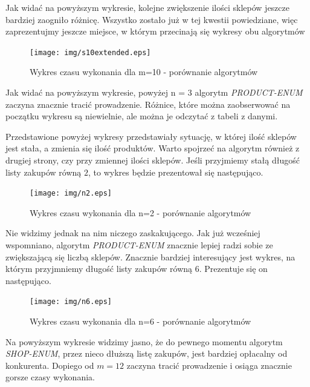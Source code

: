\documentclass[a4paper]{article}
\begin{document}
Jak widać na powyższym wykresie, kolejne zwiększenie ilości sklepów jeszcze bardziej zaogniło różnicę. Wszystko zostało już w tej kwestii powiedziane, więc zaprezentujmy jeszcze miejsce, w którym przecinają się wykresy obu algorytmów

\begin{figure}[H]
\centering
\texttt{[image: img/s10extended.eps]}
\caption{Wykres czasu wykonania dla m=10 - porównanie algorytmów}
\end{figure}

Jak widać na powyższym wykresie, powyżej n = 3 algorytm \textit{PRODUCT-ENUM} zaczyna znacznie tracić prowadzenie. Różnice, które można zaobserwować na początku wykresu są niewielnie, ale można je odczytać z tabeli z danymi. 

Przedstawione powyżej wykresy przedstawiały sytuację, w której ilość sklepów jest stała, a zmienia się ilość produktów. Warto spojrzeć na algorytm również z drugiej strony, czy przy zmiennej ilości sklepów. Jeśli przyjmiemy stałą długość listy zakupów równą $2$, to wykres będzie prezentował się następująco.

\begin{figure}[H]
\centering
\texttt{[image: img/n2.eps]}
\caption{Wykres czasu wykonania dla n=2 - porównanie algorytmów}
\end{figure}

Nie widzimy jednak na nim niczego zaskakującego. Jak już wcześniej wspomniano, algorytm \textit{PRODUCT-ENUM} znacznie lepiej radzi sobie ze zwiększającą się liczbą sklepów. Znacznie bardziej interesujący jest wykres, na którym przyjmniemy długość listy zakupów równą $6$. Prezentuje się on następująco.

\begin{figure}[H]
\centering
\texttt{[image: img/n6.eps]}
\caption{Wykres czasu wykonania dla n=6 - porównanie algorytmów}
\end{figure}

Na powyższym wykresie widzimy jasno, że do pewnego momentu algorytm \textit{SHOP-ENUM}, przez nieco dłuższą listę zakupów, jest bardziej opłacalny od konkurenta. Dopiego od $m=12$ zaczyna tracić prowadzenie i osiąga znacznie gorsze czasy wykonania.
\end{document}
